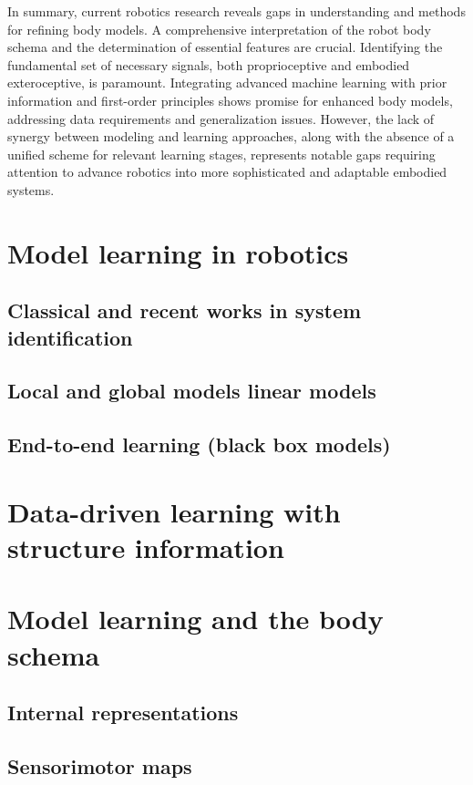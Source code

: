 In summary, current robotics research reveals gaps in understanding and methods for refining body models. A comprehensive interpretation of the robot body schema and the determination of essential features are crucial. Identifying the fundamental set of necessary signals, both proprioceptive and embodied exteroceptive, is paramount. Integrating advanced machine learning with prior information and first-order principles shows promise for enhanced body models, addressing data requirements and generalization issues. However, the lack of synergy between modeling and learning approaches, along with the absence of a unified scheme for relevant learning stages, represents notable gaps requiring attention to advance robotics into more sophisticated and adaptable embodied systems.

\section{Model learning in robotics}
\subsection{Classical and recent works in system identification}
\subsection{Local and global models linear models}
\subsection{End-to-end learning (black box models)}
\section{Data-driven learning with structure information}
\section{Model learning and the body schema}
\subsection{Internal representations}
\subsection{Sensorimotor maps}
